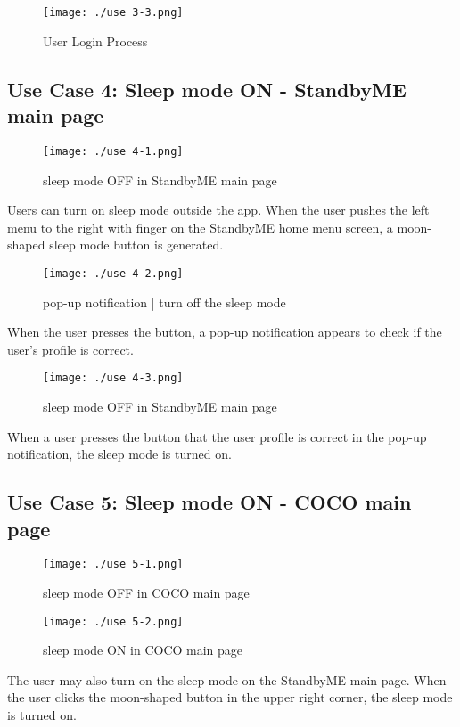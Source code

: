 \documentclass[conference]{IEEEtran}
\begin{document}
\begin{figure}[H]
\texttt{[image: ./use 3-3.png]}
\centering
\caption{User Login Process}
\end{figure}

\subsection{Use Case 4: Sleep mode ON - StandbyME main page}

\begin{figure}[H]
\texttt{[image: ./use 4-1.png]}
\centering
\caption{sleep mode OFF in StandbyME main page}
\end{figure}

Users can turn on sleep mode outside the app. When the user pushes the left menu to the right with finger on the StandbyME home menu screen, a moon-shaped sleep mode button is generated.

\begin{figure}[H]
\texttt{[image: ./use 4-2.png]}
\centering
\caption{pop-up notification | turn off the sleep mode}
\end{figure}

When the user presses the button, a pop-up notification appears to check if the user's profile is correct.

\begin{figure}[H]
\texttt{[image: ./use 4-3.png]}
\centering
\caption{sleep mode OFF in StandbyME main page}
\end{figure}

When a user presses the button that the user profile is correct in the pop-up notification, the sleep mode is turned on.

\subsection{Use Case 5: Sleep mode ON - COCO main page}

\begin{figure}[H]
\texttt{[image: ./use 5-1.png]}
\centering
\caption{sleep mode OFF in COCO main page}
\end{figure}

\begin{figure}[H]
\texttt{[image: ./use 5-2.png]}
\centering
\caption{sleep mode ON in COCO main page}
\end{figure}

The user may also turn on the sleep mode on the StandbyME main page. When the user clicks the moon-shaped button in the upper right corner, the sleep mode is turned on.
\end{document}
